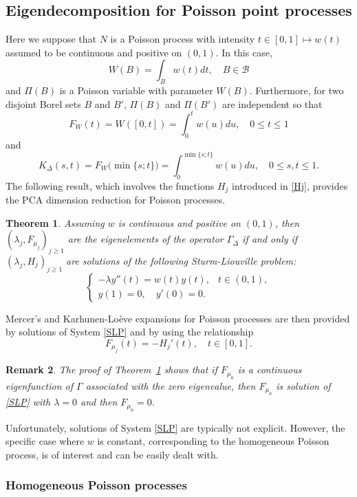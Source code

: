 \documentclass[aos]{imsart}
\theoremstyle{plain}
\newtheorem{theorem}{Theorem}[section]
\newtheorem{remark}[theorem]{Remark}
\theoremstyle{remark}
\newcommand{\1}{1}
\begin{document}
\subsection{Eigendecomposition for Poisson point processes}
\label{subsec:Poisson_theory}


Here we suppose that $N$ is a Poisson process with intensity $t\in[0,1]\longmapsto  w(t)$ assumed to be continuous and positive on $(0,1)$. In this case, 
\[
W(B)=\int_B w(t)dt,\quad B\in\mathcal B
\]
and $\Pi(B)$ is a Poisson variable with parameter $W(B)$. Furthermore, for two disjoint Borel sets $B$ and $B'$, $\Pi(B)$ and $\Pi(B')$ are independent so that
\[
F_W(t)=W([0,t])=\int_0^t w(u)du, \quad 0\leq t\leq 1
\]
and
\[K_\Delta(s,t)=F_W\big(\min\{s;t\}\big)=\int_0^{\min\{s;t\}}w(u)du, \quad 0\leq s, t\leq 1.
\]
The following result, which involves the functions $H_j$ introduced in \eqref{Hj}, provides the PCA dimension reduction for Poisson processes.
\begin{theorem}\label{KL-SLP}
Assuming $w$ is continuous and positive on $(0,1)$, then $(\lambda_j,F_{\mu_j})_{j\geq 1}$ are the eigenelements of the operator $\Gamma_\Delta$ if and only if $(\lambda_j,H_j)_{j\geq 1}$ are solutions of the following Sturm-Liouville problem:
\begin{equation}\label{SLP}
\left\{
\begin{array}{ll}
 -\lambda y''(t)=w(t)y(t),   &t\in(0,1),\\
y(1)  =0,\quad y'(0)=0.&
\end{array}
\right.
\end{equation}
\end{theorem}
Mercer's and Karhunen-Lo\`eve expansions for Poisson processes are then provided by solutions of System \eqref{SLP} and by using the relationship
\[
F_{\mu_j}(t)=-H_j'(t),\quad t\in [0,1].
\]
\begin{remark}\label{eigenvalue=0Poisson}
The proof of Theorem~\ref{KL-SLP} shows that if $F_{\mu_0}$ is a continuous eigenfunction of $\Gamma$ associated with the zero eigenvalue, then $F_{\mu_0}$ is solution of \eqref{SLP} with $\lambda=0$ and then $F_{\mu_0}=0$. 
\end{remark}
Unfortunately, solutions of System \eqref{SLP} are typically not explicit. However, the specific case where $w$ is constant, corresponding to the homogeneous Poisson process, is of interest and can be easily dealt with.


\subsubsection{Homogeneous Poisson processes}\label{sec:HomogeneousPoisson}
\end{document}
